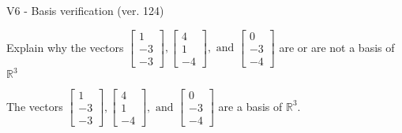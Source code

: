 \begin{exercise}
  \begin{exerciseTitle}V6 - Basis verification (ver. 124)\end{exerciseTitle}
  \begin{exerciseStatement}
    Explain why the vectors \(\left[\begin{array}{r}
1 \\
-3 \\
-3
\end{array}\right] , \left[\begin{array}{r}
4 \\
1 \\
-4
\end{array}\right] , \text{ and } \left[\begin{array}{r}
0 \\
-3 \\
-4
\end{array}\right]\) are or are not a basis of \(\mathbb{R}^3\)	


  \end{exerciseStatement}
  \begin{exerciseAnswer}
   The vectors \(\left[\begin{array}{r}
1 \\
-3 \\
-3
\end{array}\right] , \left[\begin{array}{r}
4 \\
1 \\
-4
\end{array}\right] , \text{ and } \left[\begin{array}{r}
0 \\
-3 \\
-4
\end{array}\right]\) 
  	 are  a basis of \(\mathbb{R}^3\).
  


  \end{exerciseAnswer}
\end{exercise}
